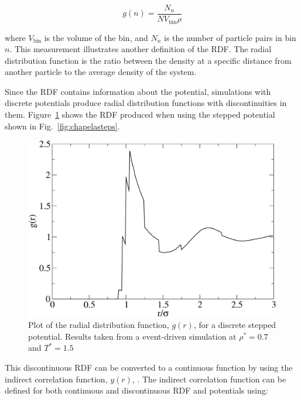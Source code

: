 \documentclass[12pt]{UoAthesis}
\begin{document}
\begin{equation}
  \label{eq:rdf}
  g(n) = \frac{N_n}{NV_{\text{bin}}\rho}
\end{equation}

where $V_{\text{bin}}$ is the volume of the bin, and $N_n$ is the
number of particle pairs in bin $n$.  This measurement illustrates
another definition of the RDF.  The radial distribution function is
the ratio between the density at a specific distance from another
particle to the average density of the system.

Since the RDF contains information about the potential, simulations
with discrete potentials produce radial distribution functions with
discontinuities in them. Figure~\ref{fig:rdfrough} shows the RDF
produced when using the stepped potential shown in
Fig.~\ref{fig:chapelasteps}.

\begin{figure}[htp] 
  \begin{center}
    \includegraphics[clip,width=\textwidth]{figures/rdfrough} 
    \caption{\label{fig:rdfrough} Plot of the radial distribution
      function, $g(r)$, for a discrete stepped potential. Results
      taken from a event-driven simulation at $\rho^*=0.7$ and $T^*=1.5$}
  \end{center}
\end{figure}

This discontinuous RDF can be converted to a continuous function by
using the indirect correlation function, $y(r)$, \cite{Chapela1989}.
The indirect correlation function can be defined for both continuous
and discontinuous RDF and potentials using:
\end{document}
